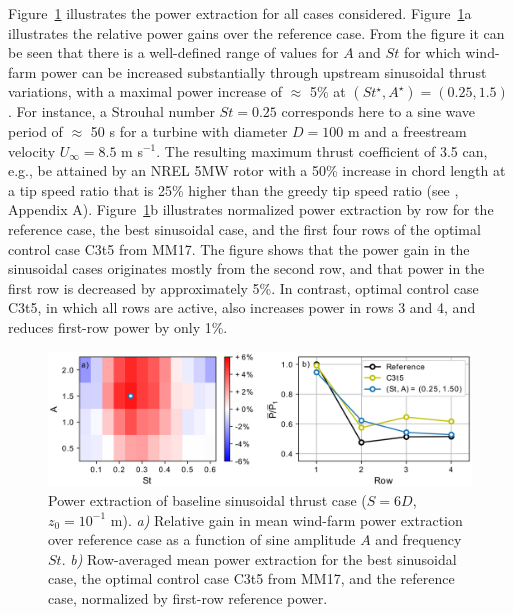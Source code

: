 \documentclass[wes, manuscript]{copernicus}
\begin{document}
Figure~\ref{fig:sinus_baseline} illustrates the power extraction for all cases considered. Figure~\ref{fig:sinus_baseline}a illustrates the relative power gains over the reference case. From the figure it can be seen that there is a well-defined range of values for $A$ and $St$ for which wind-farm power can be increased substantially through upstream sinusoidal thrust variations, with a maximal power increase of $\approx$ 5\% at $(St^\star, A^\star) = (0.25, 1.5)$. For instance, a Strouhal number $St = 0.25$ corresponds here to a sine wave period of $\approx$ 50 s for a turbine with diameter $D = 100$ m and a freestream velocity $U_\infty = 8.5$ m s$^{-1}$. The resulting maximum thrust coefficient of 3.5 can, e.g., be attained by an NREL 5MW rotor with a 50\% increase in chord length at a tip speed ratio that is 25\% higher than the greedy tip speed ratio (see \citealp{goit2015optimal}, Appendix A). Figure~\ref{fig:sinus_baseline}b illustrates normalized power extraction by row for the reference case, the best sinusoidal case, and the first four rows of the optimal control case C3t5 from MM17. The figure shows that the power gain in the sinusoidal cases originates mostly from the second row, and that power in the first row is decreased by approximately 5\%. In contrast, optimal control case C3t5, in which all rows are active, also increases power in rows 3 and 4, and reduces first-row power by only 1\%. 
\begin{figure}
	\centering
	\includegraphics[width=\textwidth]{gains_turbulent_6D_6D_6D_wide_inphase2.eps}
	\caption{Power extraction of baseline sinusoidal thrust case ($S = 6D$, $z_0 = 10^{-1}$ m). \emph{a) } Relative gain in mean wind-farm power extraction over reference case as a function of sine amplitude $A$ and frequency $St$. \emph{b) } Row-averaged mean power extraction for the best sinusoidal case, the optimal control case C3t5 from MM17, and the reference case, normalized by first-row reference power.\label{fig:sinus_baseline} }
\end{figure}
\end{document}
